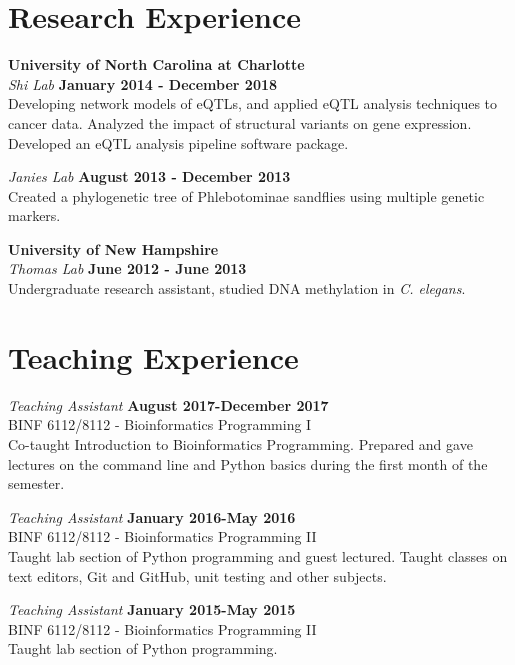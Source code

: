 \documentclass[margin,line]{res}
\begin{document}
\begin{resume}
\section{\sc Research Experience}
{\bf University of North Carolina at Charlotte}\\
{\em Shi Lab} \hfill {\bf January 2014 - December 2018}\\
%
Developing network models of eQTLs, and applied eQTL analysis techniques to cancer data.
Analyzed the impact of structural variants on gene expression.
Developed an eQTL analysis pipeline software package. 

{\em Janies Lab} \hfill {\bf August 2013 - December 2013}\\
Created a phylogenetic tree of Phlebotominae sandflies using multiple genetic markers.    
\hspace*{.05in} 

{\bf University of New Hampshire}\\
{\em Thomas Lab} \hfill {\bf June 2012 - June 2013}\\
Undergraduate research assistant, studied DNA methylation in {\em C. elegans}.\\ 


\section{\sc Teaching Experience}

{\em Teaching Assistant} \hfill {\bf August 2017-December 2017}\\
BINF 6112/8112 - Bioinformatics Programming I\\ 
Co-taught Introduction to Bioinformatics Programming. Prepared and gave lectures on the command line and Python basics during the first month of the semester. 

{\em Teaching Assistant} \hfill {\bf January 2016-May 2016}\\
BINF 6112/8112 - Bioinformatics Programming II\\
Taught lab section of Python programming and guest lectured. Taught classes on text editors, Git and GitHub, unit testing and other subjects.

{\em Teaching Assistant} \hfill {\bf January 2015-May 2015}\\
BINF 6112/8112 - Bioinformatics Programming II\\
Taught lab section of Python programming. 


\end{resume}
\end{document}
